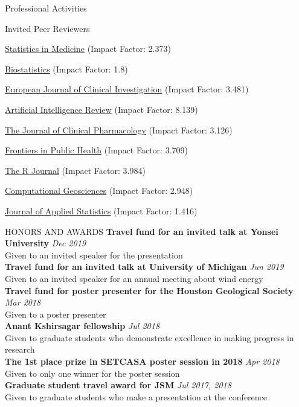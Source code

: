 \documentclass[
	11pt, %
]{resume} %
\begin{document}
\begin{rSection}{Professional Activities}
\begin{rSubsection}{
Invited Peer Reviewers}{}{}{}
\item \href{https://onlinelibrary.wiley.com/journal/10970258}{Statistics in Medicine} (Impact Factor: 2.373)
\item \href{https://academic.oup.com/biostatistics}{Biostatistics} (Impact Factor: 1.8)
\item \href{https://onlinelibrary.wiley.com/journal/13652362}{European Journal of Clinical Investigation} (Impact Factor: 3.481)
\item \href{https://www.springer.com/journal/10462}{Artificial Intelligence Review} (Impact Factor: 8.139)
\item \href{https://accp1.onlinelibrary.wiley.com/journal/15524604}{The Journal of Clinical Pharmacology} (Impact Factor: 3.126)
\item \href{https://www.frontiersin.org/journals/public-health}{Frontiers in Public Health} (Impact Factor: 3.709)
\item \href{https://journal.r-project.org/}{The R Journal} (Impact Factor: 3.984)
\item \href{https://www.springer.com/journal/10596}{Computational Geosciences} (Impact Factor: 2.948)
\item \href{https://www.tandfonline.com/journals/cjas20}{Journal of Applied Statistics} (Impact Factor: 1.416)
\end{rSubsection}
\end{rSection}


\begin{rSection}{HONORS AND AWARDS}
{\bf Travel fund for an invited talk at Yonsei University} \hfill {\em Dec 2019} \\ 
Given to an invited speaker for the presentation
\\
{\bf Travel fund for an invited talk at University of Michigan} \hfill {\em Jun 2019} \\ 
Given to an invited speaker for an annual meeting about wind energy
\\
{\bf Travel fund for poster presenter for the Houston Geological Society} \hfill {\em Mar 2018} \\ 
Given to a poster presenter 
\\
{\bf Anant Kshirsagar fellowship} \hfill {\em Jul 2018} \\ 
Given to graduate students who demonstrate excellence in making progress in research
\\
{\bf The 1st place prize in SETCASA poster session in 2018 } \hfill {\em Apr 2018} \\ 
Given to only one winner for the poster session 
\\
{\bf Graduate student travel award for JSM} \hfill {\em Jul 2017, 2018} \\ 
Given to graduate students who make a presentation at the conference
\end{rSection}
\end{document}

